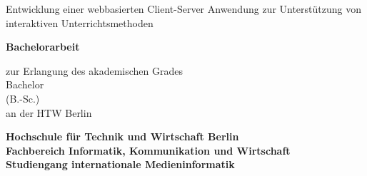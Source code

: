 \documentclass[12pt,a4paper,bibtotoc,pointlessnumbers]{scrartcl}
\begin{document}
	\begin{titlepage}
		\begin{center}
			
			
			 
			\begin{doublespace}
			{\huge Entwicklung einer webbasierten Client-Server Anwendung zur Unterstützung von interaktiven Unterrichtsmethoden}\\
			\end{doublespace}
			\vspace{2cm}
			
			{\huge \bf Bachelorarbeit}\\
			\vspace{0.4cm}
			
			{\large zur Erlangung des akademischen Grades\\ Bachelor\\ (B.-Sc.)\\an der HTW Berlin}\\
			
			\vspace{1cm}
			
			{\Large \bf Hochschule für Technik und Wirtschaft Berlin}\\
			{\large \bf Fachbereich Informatik, Kommunikation und Wirtschaft\\
			Studiengang internationale Medieninformatik}\\
		

\end{center}
\end{titlepage}
\end{document}
